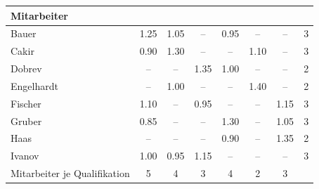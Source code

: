 
\begin{tabular}{@{}lS[table-format=1.2]S[table-format=1.2]S[table-format=1.2]S[table-format=1.2]S[table-format=1.2]S[table-format=1.2]S[table-format=1.0]@{}}
\toprule
Mitarbeiter & {} & {} & {} & {} & {} & {} & {} \\
\midrule
  Bauer & 1.25 & 1.05 & {--} & 0.95 & {--} & {--} & 3 \\
  Cakir & 0.90 & 1.30 & {--} & {--} & 1.10 & {--} & 3 \\
  Dobrev & {--} & {--} & 1.35 & 1.00 & {--} & {--} & 2 \\
  Engelhardt & {--} & 1.00 & {--} & {--} & 1.40 & {--} & 2 \\
  Fischer & 1.10 & {--} & 0.95 & {--} & {--} & 1.15 & 3 \\
  Gruber & 0.85 & {--} & {--} & 1.30 & {--} & 1.05 & 3 \\
  Haas & {--} & {--} & {--} & 0.90 & {--} & 1.35 & 2 \\
  Ivanov & 1.00 & 0.95 & 1.15 & {--} & {--} & {--} & 3 \\
\midrule
Mitarbeiter je Qualifikation & 5 & 4 & 3 & 4 & 2 & 3 & \\
\bottomrule
\end{tabular}
